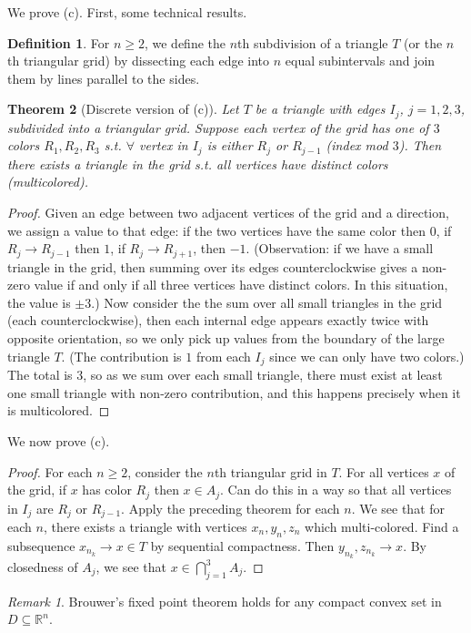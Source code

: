 \documentclass{article}
\theoremstyle{definition}
\newtheorem{defn}{Definition}[section]
\theoremstyle{remark}
\newtheorem{rem}{Remark}
\theoremstyle{plain}
\newtheorem{thm}[defn]{Theorem}
\newcommand{\RR}{\mathbb{R}}
\begin{document}
We prove (c). First, some technical results.
\begin{defn}
    For $n\ge 2$, we define the $n$th subdivision of a triangle $T$ (or the $n$th triangular grid) by dissecting each edge into $n$ equal subintervals and join them by lines parallel to the sides.
\end{defn}
\begin{thm}[Discrete version of (c)]
    Let $T$ be a triangle with edges $I_j$, $j=1,2,3$, subdivided into a triangular grid. Suppose each vertex of the grid has one of $3$ colors $R_1,R_2,R_3$ s.t. $\forall$ vertex in $I_j$ is either $R_j$ or $R_{j-1}$ (index mod $3$). Then there exists a triangle in the grid s.t. all vertices have distinct colors (multicolored).
\end{thm}
\begin{proof}
    Given an edge between two adjacent vertices of the grid and a direction, we assign a value to that edge: if the two vertices have the same color then $0$, if $R_j\to R_{j-1}$ then $1$, if $R_j\to R_{j+1}$, then $-1$. (Observation: if we have a small triangle in the grid, then summing over its edges counterclockwise gives a non-zero value if and only if all three vertices have distinct colors. In this situation, the value is $\pm 3$.)
    Now consider the the sum over all small triangles in the grid (each counterclockwise), then each internal edge appears exactly twice with opposite orientation, so we only pick up values from the boundary of the large triangle $T$. (The contribution is $1$ from each $I_j$ since we can only have two colors.) The total is $3$, so as we sum over each small triangle,  there must exist at least one small triangle with non-zero contribution, and this happens precisely when it is multicolored.
\end{proof}
We now prove (c).
\begin{proof}
    For each $n\ge 2$, consider the $n$th triangular grid in $T$. For all vertices $x$ of the grid, if $x$ has color $R_j$ then $x\in A_j$. Can do this in a way so that all vertices in $I_j$ are $R_j$ or $R_{j-1}$. Apply the preceding theorem for each $n$. We see that for each $n$, there exists a triangle with vertices $x_n,y_n,z_n$ which multi-colored. Find a subsequence $x_{n_k}\to x\in T$ by sequential compactness. Then $y_{n_k},z_{n_k}\to x$. By closedness of $A_j$, we see that $x\in\bigcap_{j=1}^3A_j$. 
\end{proof}
\begin{rem}
    Brouwer's fixed point theorem holds for any compact convex set in $D\subseteq\RR^n$.
\end{rem}
\end{document}

